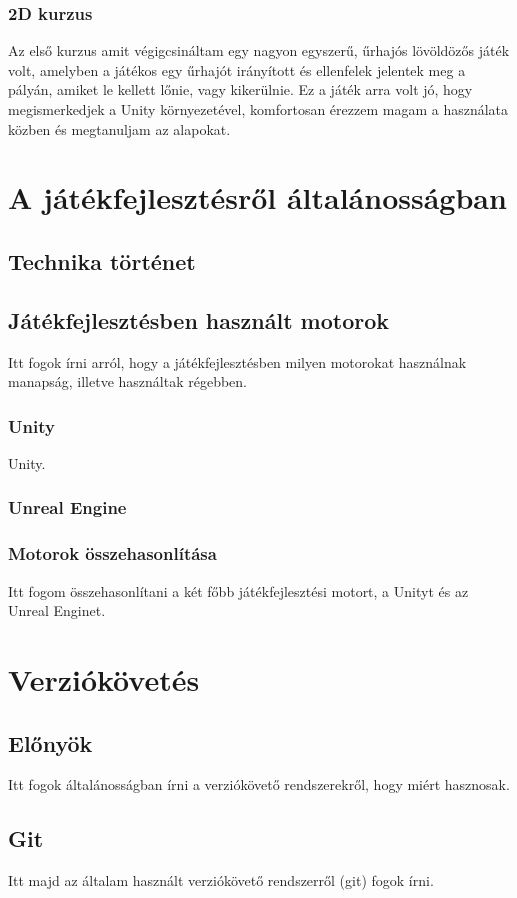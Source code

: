 \documentclass[]{thesis-ekf}
\begin{document}
\subsection{2D kurzus}
Az első kurzus amit végigcsináltam egy nagyon egyszerű, űrhajós lövöldözős játék volt, amelyben a játékos egy űrhajót irányított és ellenfelek jelentek meg a pályán, amiket le kellett lőnie, vagy kikerülnie. Ez a játék arra volt jó, hogy megismerkedjek a Unity környezetével, komfortosan érezzem magam a használata közben és megtanuljam az alapokat.
\chapter{A játékfejlesztésről általánosságban}
\section{Technika történet}


\section{Játékfejlesztésben használt motorok}
Itt fogok írni arról, hogy a játékfejlesztésben milyen motorokat használnak manapság, illetve használtak régebben.
\subsection{Unity}
Unity.
\subsection{Unreal Engine}
\subsection{Motorok összehasonlítása}
Itt fogom összehasonlítani a két főbb játékfejlesztési motort, a Unityt és az Unreal Enginet.

\chapter{Verziókövetés}
\section{Előnyök}
Itt fogok általánosságban írni a verziókövető rendszerekről, hogy miért hasznosak.
\section{Git}
Itt majd az általam használt verziókövető rendszerről (git) fogok írni.
\end{document}
